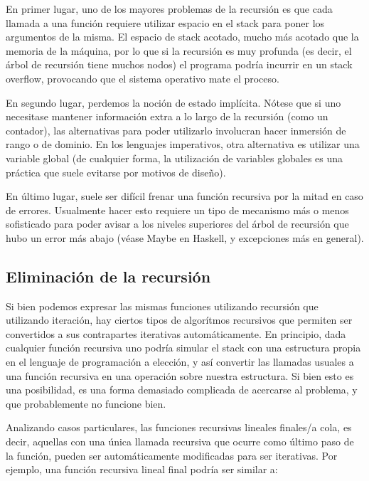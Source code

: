 \documentclass[10pt,a4paper,notitlepage]{article}
\begin{document}
En primer lugar, uno de los mayores problemas de la recursión es que cada llamada a una función requiere utilizar espacio en el stack para poner los argumentos de la misma. El espacio de stack acotado, mucho más acotado que la memoria de la máquina, por lo que si la recursión es muy profunda (es decir, el árbol de recursión tiene muchos nodos) el programa podría incurrir en un stack overflow, provocando que el sistema operativo mate el proceso.

En segundo lugar, perdemos la noción de estado implícita. Nótese que si uno necesitase mantener información extra a lo largo de la recursión (como un contador), las alternativas para poder utilizarlo involucran hacer inmersión de rango o de dominio. En los lenguajes imperativos, otra alternativa es utilizar una variable global (de cualquier forma, la utilización de variables globales es una práctica que suele evitarse por motivos de diseño).

En último lugar, suele ser difícil frenar una función recursiva por la mitad en caso de errores. Usualmente hacer esto requiere un tipo de mecanismo más o menos sofisticado para poder avisar a los niveles superiores del árbol de recursión que hubo un error más abajo (véase Maybe en Haskell, y excepciones más en general).

\subsection{Eliminación de la recursión}

Si bien podemos expresar las mismas funciones utilizando recursión que utilizando iteración, hay ciertos tipos de algorítmos recursivos que permiten ser convertidos a sus contrapartes iterativas automáticamente. En principio, dada cualquier función recursiva uno podría simular el stack con una estructura propia en el lenguaje de programación a elección, y así convertir las llamadas usuales a una función recursiva en una operación sobre nuestra estructura. Si bien esto es una posibilidad, es una forma demasiado complicada de acercarse al problema, y que probablemente no funcione bien.


Analizando casos particulares, las funciones recursivas lineales finales/a cola, es decir, aquellas con una única llamada recursiva que ocurre como último paso de la función, pueden ser automáticamente modificadas para ser iterativas. Por ejemplo, una función recursiva lineal final podría ser similar a:
\end{document}
